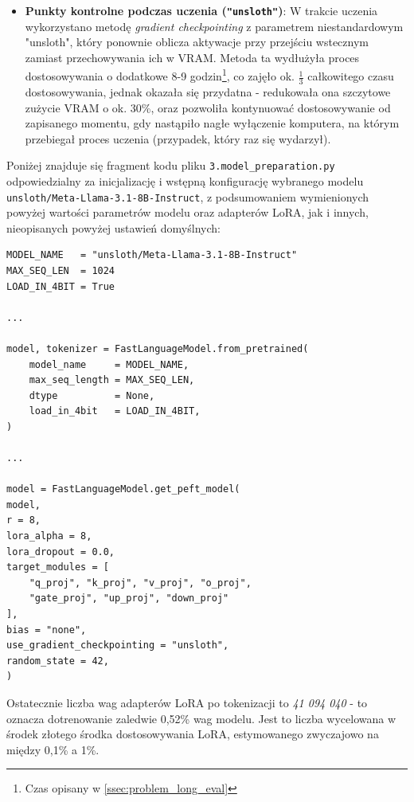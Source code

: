 \documentclass[12pt,a4paper]{article}
\begin{document}
\begin{itemize}
    \item \textbf{Punkty kontrolne podczas uczenia (\texttt{"unsloth"})}: W trakcie uczenia wykorzystano metodę \emph{gradient checkpointing} z parametrem niestandardowym
            "unsloth", który ponownie oblicza aktywacje przy przejściu wstecznym zamiast przechowywania ich w VRAM. Metoda ta wydłużyła proces dostosowywania o dodatkowe 
            8-9 godzin\footnote{Czas opisany w \ref{ssec:problem_long_eval}}, co zajęło ok. $\frac{1}{3}$ całkowitego czasu dostosowywania, jednak okazała się przydatna - redukowała ona szczytowe zużycie VRAM o ok. 30\%, 
            oraz pozwoliła kontynuować dostosowywanie od zapisanego momentu, gdy nastąpiło nagłe wyłączenie komputera, na którym przebiegał proces uczenia (przypadek, 
            który raz się wydarzył).
    
\end{itemize}

Poniżej znajduje się fragment kodu pliku \texttt{3.model\_preparation.py} odpowiedzialny za inicjalizację i wstępną konfigurację wybranego modelu \texttt{unsloth/Meta-Llama-3.1-8B-Instruct},
z podsumowaniem wymienionych powyżej wartości parametrów modelu oraz adapterów LoRA, jak i innych, nieopisanych powyżej ustawień domyślnych:

\begin{tcolorbox}
\begin{verbatim}
MODEL_NAME   = "unsloth/Meta-Llama-3.1-8B-Instruct"
MAX_SEQ_LEN  = 1024   
LOAD_IN_4BIT = True

... 

model, tokenizer = FastLanguageModel.from_pretrained(
    model_name     = MODEL_NAME,
    max_seq_length = MAX_SEQ_LEN,
    dtype          = None,
    load_in_4bit   = LOAD_IN_4BIT,
)

...

model = FastLanguageModel.get_peft_model(
model,
r = 8,       
lora_alpha = 8,      
lora_dropout = 0.0,     
target_modules = [
    "q_proj", "k_proj", "v_proj", "o_proj",
    "gate_proj", "up_proj", "down_proj"
],
bias = "none",
use_gradient_checkpointing = "unsloth",
random_state = 42,
)
\end{verbatim}
\end{tcolorbox}

Ostatecznie liczba wag adapterów LoRA po tokenizacji to \emph{41 094 040} - to oznacza dotrenowanie zaledwie 0,52\% wag modelu.
Jest to liczba wycelowana w środek złotego środka dostosowywania LoRA, estymowanego zwyczajowo na między 0,1\% a 1\%. 
\end{document}
